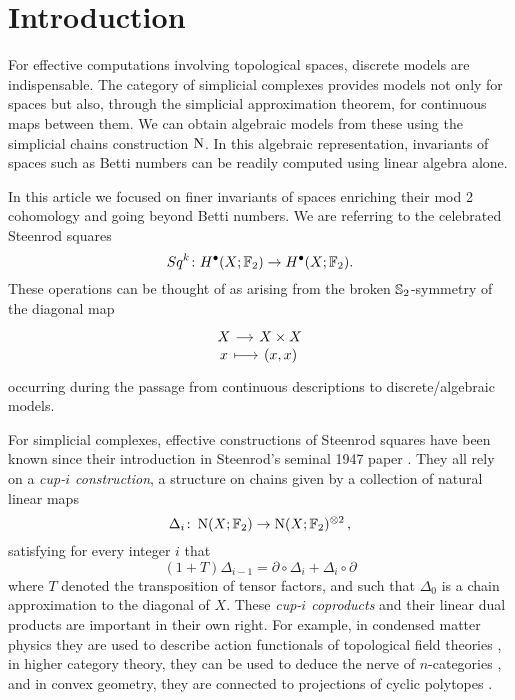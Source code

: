 
\section{Introduction}

For effective computations involving topological spaces, discrete models are indispensable.
The category of simplicial complexes provides models not only for spaces but also, through the simplicial approximation theorem, for continuous maps between them.
We can obtain algebraic models from these using the simplicial chains construction $\chains$.
In this algebraic representation, invariants of spaces such as Betti numbers can be readily computed using linear algebra alone.

In this article we focused on finer invariants of spaces enriching their mod 2 cohomology and going beyond Betti numbers.
We are referring to the celebrated Steenrod squares
\begin{equation*}
Sq^k \colon H^\bullet(X; \Ftwo) \to H^\bullet(X; \Ftwo).
\end{equation*}
These operations can be thought of as arising from the broken $\S_2$-symmetry of the diagonal map
\begin{equation*}
\begin{tikzcd}[column sep=small, row sep=-3pt]
X \arrow[r] & X \times X \\
x \arrow[r, mapsto] & (x,x)
\end{tikzcd}
\end{equation*}
occurring during the passage from continuous descriptions to discrete/algebraic models.

For simplicial complexes, effective constructions of Steenrod squares have been known since their introduction in Steenrod's seminal 1947 paper \cite{steenrod1947products}.
They all rely on a \textit{cup-$i$ construction}, a structure on chains given by a collection of natural linear maps
\begin{equation*}
\Delta_i \colon \chains(X; \Ftwo)  \to \chains(X; \Ftwo)^{\otimes 2}\,,
\end{equation*}
satisfying for every integer $i$ that
\begin{equation*}
(1+T) \Delta_{i-1} =
\partial \circ \Delta_i + \Delta_i \circ \partial
\end{equation*}
where $T$ denoted the transposition of tensor factors,
and such that $\Delta_0$ is a chain approximation to the diagonal of $X$.
These \textit{cup-$i$ coproducts} and their linear dual products are important in their own right.
For example, in condensed matter physics they are used to describe action functionals of topological field theories \cite{gaiotto2016spin, bhardwaj2017state, kapustin2017fermionic}, in higher category theory, they can be used to deduce the nerve of $n$-categories \cite{medina2020globular}, and in convex geometry, they are connected to projections of cyclic polytopes \cite{kapranov1991combinatorial}.

